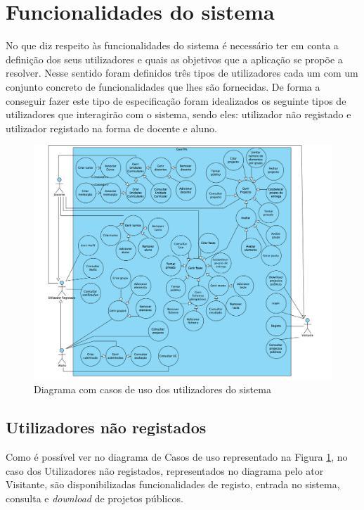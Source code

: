\section{Funcionalidades do sistema}

No que diz respeito às funcionalidades do sistema é necessário ter em conta a definição dos seus 
utilizadores e quais as objetivos que a aplicação se propõe a resolver.
Nesse sentido foram definidos três tipos de utilizadores cada um com um conjunto concreto de 
funcionalidades que lhes são fornecidas.
De forma a conseguir fazer este tipo de especificação foram idealizados os seguinte tipos de utilizadores
que interagirão com o sistema, sendo eles: utilizador não registado e utilizador registado na forma de 
docente e aluno.

\begin{figure}[htbp!] 
   \centering
   \includegraphics[width=1\textwidth]{images/funcionalidades/usecases.png}
    \caption{Diagrama com casos de uso dos utilizadores do sistema}
    \label{fig: usecases}
 \end{figure}

\subsection{Utilizadores não registados}

Como é possível ver no diagrama de Casos de uso representado na Figura \ref{fig: usecases}, no caso 
dos Utilizadores não registados, representados no diagrama pelo ator Visitante, são disponibilizadas
funcionalidades de registo, entrada no sistema, consulta e \textit{download} de projetos públicos.

